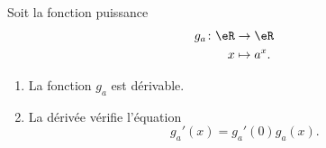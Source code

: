 \begin{proposition}       \label{PROPooMXCDooBffXbl}
    Soit la fonction puissance
    \begin{equation}
        \begin{aligned}
            g_a\colon \eR&\to \eR \\
            x&\mapsto a^x.
        \end{aligned}
    \end{equation}
    \begin{enumerate}
        \item
            La fonction \( g_a\) est dérivable.
        \item
            La dérivée vérifie l'équation
            \begin{equation}        \label{EQooNIUJooPqDnax}
                g_a'(x)=g_a'(0)g_a(x).
            \end{equation}
    \end{enumerate}
\end{proposition}

